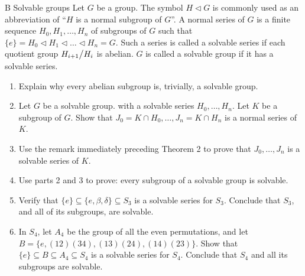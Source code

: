 \begin{exercise}{B Solvable groups}
Let $G$ be a group. The symbol $H\triangleleft G$ is commonly used as an abbreviation of ``$H$ is a normal subgroup of $G$''. A normal series of $G$ is a finite sequence $H_0,H_1,\dots,H_n$ of subgroups of $G$ such that $\{e\}=H_0\triangleleft H_1\triangleleft\dots\triangleleft H_n=G$. Such a series is called a solvable series if each quotient group ${\textstyle H_{i+1}}\big/{\textstyle H_i}$ is abelian. $G$ is called a solvable group if it has a solvable series.
\begin{enumerate}
    \item Explain why every abelian subgroup is, trivially, a solvable group.
    \item Let $G$ be a solvable group. with a solvable series $H_0,\dots,H_n$. Let $K$ be a subgroup of $G$. Show that $J_0=K\cap H_0,\dots,J_n=K\cap H_n$ is a normal series of $K$.
    \item Use the remark immediately preceding Theorem 2 to prove that $J_0,\dots,J_n$ is a solvable series of $K$.
     \item Use parts 2 and 3 to prove: every subgroup of a solvable group is solvable.
     \item Verify that $\{e\}\subseteq\{e,\beta,\delta\}\subseteq S_3$ is a solvable series for $S_3$. Conclude that $S_3$, and all of its subgroups, are solvable.
     \item In $S_4$, let $A_4$ be the group of all the even permutations, and let $B=\{e,(12)(34),(13)(24),(14)(23)\}$. Show that $\{e\}\subseteq B\subseteq A_4\subseteq S_4$ is a solvable series for $S_4$. Conclude that $S_4$ and all its subgroups are solvable.
\end{enumerate}
\end{exercise}
